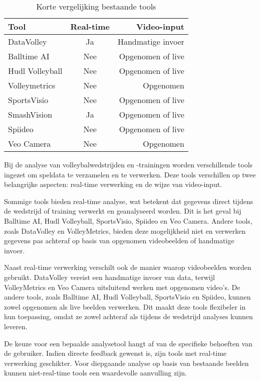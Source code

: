 \begin{table}
  \centering
  \begin{tabular}{lcr}
    \toprule
    \textbf{Tool} & \textbf{Real-time} & \textbf{Video-input}\\
    \midrule
    DataVolley & Ja & Handmatige invoer \\
    Balltime AI & Nee & Opgenomen of live \\
    Hudl Volleyball & Nee & Opgenomen of live \\
    Volleymetrics & Nee & Opgenomen \\
    SportsVisio & Nee & Opgenomen of live \\
    SmashVision & Ja & Opgenomen of live \\
    Spiideo & Nee & Opgenomen of live \\
    Veo Camera & Nee & Opgenomen \\
    \bottomrule
  \end{tabular}
  \caption[Korte vergelijking bestaande tools]{\label{tab:tools}Korte vergelijking bestaande tools}
\end{table}

Bij de analyse van volleybalwedstrijden en -trainingen worden verschillende tools ingezet om speldata te verzamelen en te verwerken. Deze tools verschillen op twee belangrijke aspecten: real-time verwerking en de wijze van video-input.

Sommige tools bieden real-time analyse, wat betekent dat gegevens direct tijdens de wedstrijd of training verwerkt en geanalyseerd worden. Dit is het geval bij Balltime AI, Hudl Volleyball, SportsVisio, Spiideo en Veo Camera. Andere tools, zoals DataVolley en VolleyMetrics, bieden deze mogelijkheid niet en verwerken gegevens pas achteraf op basis van opgenomen videobeelden of handmatige invoer.

Naast real-time verwerking verschilt ook de manier waarop videobeelden worden gebruikt. DataVolley vereist een handmatige invoer van data, terwijl VolleyMetrics en Veo Camera uitsluitend werken met opgenomen video’s. De andere tools, zoals Balltime AI, Hudl Volleyball, SportsVisio en Spiideo, kunnen zowel opgenomen als live beelden verwerken. Dit maakt deze tools flexibeler in hun toepassing, omdat ze zowel achteraf als tijdens de wedstrijd analyses kunnen leveren.

De keuze voor een bepaalde analysetool hangt af van de specifieke behoeften van de gebruiker. Indien directe feedback gewenst is, zijn tools met real-time verwerking geschikter. Voor diepgaande analyse op basis van bestaande beelden kunnen niet-real-time tools een waardevolle aanvulling zijn.